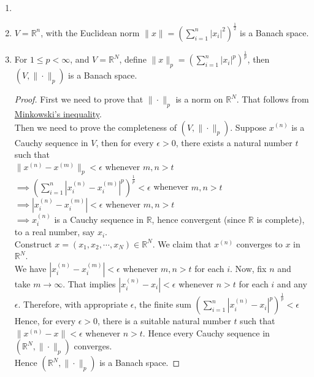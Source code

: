 \begin{eg}
    \begin{enumerate}
        \item []
        \item $V=\mathbb{R}^{n}$, with the Euclidean norm $\|x\|=\left(\sum_{i=1}^{n}|x_{i}|^{2}\right)^{\frac{1}{2}}$ is a Banach space.
        \item For $1\leq p<\infty$, and $V=\mathbb{R}^{N}$, define $\|x\|_{p}=\left(\sum_{i=1}^{n}|x_{i}|^{p}\right)^{\frac{1}{p}}$, then $(V,\|\cdot\|_{p})$ is a Banach space.
            \begin{proof}
                First we need to prove that $\|\cdot\|_{p}$ is a norm on $\mathbb{R}^{N}$. That follows from \hyperlink{minkowski}{Minkowski's inequality}.\\
                Then we need to prove the completeness of $(V,\|\cdot\|_{p})$. Suppose $x^{(n)}$ is a Cauchy sequence in $V$, then for every $\epsilon>0$, there exists a natural number $t$ such that\\
                $\|x^{(n)}-x^{(m)}\|_{p}<\epsilon$ whenever $m,n>t$\\ 
                $\implies \left(\sum_{i=1}^{n}\left|x^{(n)}_{i}-x_{i}^{(m)}\right|^{p}\right)^{\frac{1}{p}  }<\epsilon$ whenever $m,n>t$\\ 
                $\implies |x_{i}^{(n)}-x_{i}^{(m)}|<\epsilon$ whenever $m,n>t$\\
                $\implies x_{i}^{(n)}$ is a Cauchy sequence in $\mathbb{R}$, hence convergent (since $\mathbb{R}$ is complete), to a real number, say $x_{i}$.\\
                Construct $x=(x_{1},x_{2},\cdots,x_{N})\in \mathbb{R}^{N}$. We claim that $x^{(n)}$ converges to $x$ in $\mathbb{R}^{N}$.\\ 
                We have $|x_{i}^{(n)}-x_{i}^{(m)}|<\epsilon$ whenever $m,n>t$ for each $i$. Now, fix $n$ and take $m\to\infty$.
                That implies $|x_{i}^{(n)}-x_{i}|<\epsilon$ whenever $n>t$ for each $i$ and any $\epsilon$.
                Therefore, with appropriate $\epsilon$, the finite sum $\left(\sum_{i=1}^{n}\left|x^{(n)}_{i}-x_{i}\right|^{p}\right)^{\frac{1}{p}  }<\epsilon$\\
                Hence, for every $\epsilon>0$, there is a suitable natural number $t$ such that $\|x^{(n)}-x\|<\epsilon$ whenever $n>t$. Hence every Cauchy sequence in $(\mathbb{R}^{N},\|\cdot\|_{p})$ converges.\\
                Hence $(\mathbb{R}^{N},\|\cdot\|_{p})$ is a Banach space.

\end{proof}
\end{enumerate}
\end{eg}
